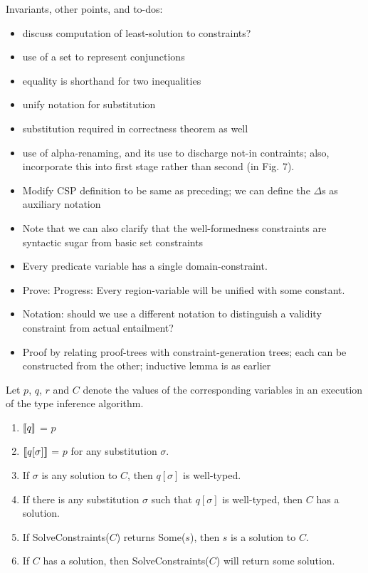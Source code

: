 Invariants, other points, and to-dos:
\begin{itemize}
  \item discuss computation of least-solution to constraints?
  \item use of a set to represent conjunctions
  \item equality is shorthand for two inequalities
  \item unify notation for substitution
  \item substitution required in correctness theorem as well
  \item use of alpha-renaming, and its use to discharge not-in contraints;
also, incorporate this into first stage rather than second (in Fig. 7).
  \item Modify CSP definition to be same as preceding; we can define the $\Delta$s 
    as auxiliary notation
  \item Note that we can also clarify that the well-formedness constraints are
    syntactic sugar from basic set constraints
  \item Every predicate variable has a single domain-constraint.
  \item Prove: Progress: Every region-variable will be unified with some constant.
  \item Notation: should we use a different notation to distinguish a validity constraint
    from actual entailment?
  \item Proof by relating proof-trees with constraint-generation trees; each can
    be constructed from the other; inductive lemma is as earlier
\end{itemize}

\begin{theorem}
Let $p$, $q$, $r$ and $C$ denote the values of the corresponding
variables in an execution of the type inference algorithm.
\begin{enumerate}
\item $\llbracket q \rrbracket$ = $p$
\item $\llbracket q[\sigma] \rrbracket$ = $p$ for any substitution $\sigma$.
\item If $\sigma$ is any solution to $C$, then $q[\sigma]$ is well-typed.
\item If there is any substitution $\sigma$ such that $q[\sigma]$ is well-typed, then
$C$ has a solution.
\item If SolveConstraints($C$) returns Some($s$), then $s$ is a solution to $C$.
\item If $C$ has a  solution, then SolveConstraints($C$) will return some solution.
\end{enumerate}
\end{theorem}
